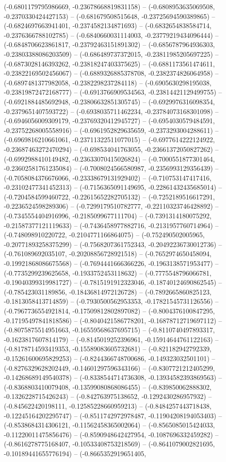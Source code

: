 (-0.6801179795986669, -0.23678668819831158) -- (-0.6808953635069508, -0.2370330424427153) -- (-0.681679508515648, -0.23725694590389865) -- (-0.6824697663941401, -0.2374582134871693) -- (-0.6832654838584714, -0.2376366788102785) -- (-0.6840660031114003, -0.23779219434096444) -- (-0.6848706623861817, -0.23792463151891302) -- (-0.6856787964936303, -0.23803388086203509) -- (-0.686489737372015, -0.23811985205697225) -- (-0.6873028146393262, -0.23818247403375625) -- (-0.6881173561474611, -0.23822169502456067) -- (-0.6889326885378708, -0.2382374826064958) -- (-0.6897481377982058, -0.2382298237284118) -- (-0.6905630298195038, -0.23819872472168777) -- (-0.6913766909534563, -0.23814421129499755) -- (-0.6921884485692948, -0.23806632851305745) -- (-0.6929976316098354, -0.2379651407593722) -- (-0.6938035711462234, -0.23784073168301098) -- (-0.6946056009309179, -0.23769320412945727) -- (-0.6954030579484591, -0.23752268005558916) -- (-0.6961952829635659, -0.2373293004288611) -- (-0.6969816210661061, -0.23711322511077015) -- (-0.6977614222124922, -0.23687463272470294) -- (-0.698534041763055, -0.23661372050827262) -- (-0.6992988410149482, -0.23633070415026824) -- (-0.7000551877301464, -0.23602581761235084) -- (-0.7008024566580987, -0.2356993129356439) -- (-0.7058084376676066, -0.23338679131929402) -- (-0.710753147417416, -0.23102477341452313) -- (-0.7156365091149695, -0.22861432435685014) -- (-0.7204584599460722, -0.22615652282705132) -- (-0.7252189516617291, -0.2236524598289306) -- (-0.7299179510782777, -0.22110323746428892) -- (-0.7345554404916996, -0.2185099677111704) -- (-0.7391314180075292, -0.21587377121119633) -- (-0.7436458977882716, -0.2131957760714964) -- (-0.748098910220722, -0.2104771166864075) -- (-0.752490502005965, -0.20771893258375299) -- (-0.7568207361752343, -0.20492236730012736) -- (-0.761089692035107, -0.20208856728921518) -- (-0.7652974650458094, -0.19921868086675568) -- (-0.7694441666366226, -0.1963138571953477) -- (-0.7735299239625658, -0.1933752453118632) -- (-0.7775548796066781, -0.19040399319981727) -- (-0.7815191912323046, -0.18740124690862545) -- (-0.785423031189856, -0.18436814972126728) -- (-0.7892665860825123, -0.1813058413714859) -- (-0.7930500562953353, -0.17821545731126556) -- (-0.7967736554921814, -0.17509812802897082) -- (-0.8004376100847295, -0.17195497841818586) -- (-0.8040421586778201, -0.16878712719697112) -- (-0.8075875514951663, -0.16559568637695715) -- (-0.8110740497893317, -0.1623817607814179) -- (-0.8145019252396961, -0.15914644761122163) -- (-0.8178714593419353, -0.15589083605732681) -- (-0.821182942792339, -0.15261600695829253) -- (-0.8244366748700686, -0.149323032501101) -- (-0.8276329628202449, -0.14601297596343166) -- (-0.8307721212405299, -0.14268689149540378) -- (-0.8338544714736308, -0.13934582393869563) -- (-0.8368803410079408, -0.13599080868086455) -- (-0.839850062888302, -0.1326228715426243) -- (-0.842763975138652, -0.1292430286957932) -- (-0.845622420198111, -0.12585228660959213) -- (-0.8484257443718438, -0.12245164202295747) -- (-0.8511742972978487, -0.11904208194053403) -- (-0.8538684314306121, -0.11562458365002064) -- (-0.8565085015424033, -0.11220011475856476) -- (-0.8590948642427954, -0.1087696332459282) -- (-0.8616278775168407, -0.10533408753218569) -- (-0.8641079002821695, -0.10189441655776194) -- (-0.8665352919651405, 